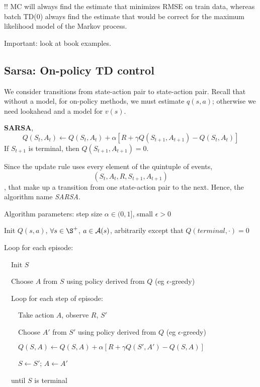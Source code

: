 \documentclass[sutton_barto_notes.tex]{subfiles}
\begin{document}
!! MC will always find the estimate that minimizes RMSE on train data, whereas batch TD(0) always find the estimate that would be correct for the maximum likelihood model of the Markov process.

Important: look at book examples.

\subsection{Sarsa: On-policy TD control}

We consider transitions from state-action pair to state-action pair. Recall that without a model, for on-policy methods, we must estimate $q(s,a)$; otherwise we need lookahead and a model for $v(s)$.

\begin{definition}
\textbf{SARSA},
$$ Q(S_t, A_t) \leftarrow Q(S_t, A_t) + \alpha [ R + \gamma Q( S_{t+1}, A_{t+1}) - Q(S_t, A_t)]$$
If $S_{t+1}$ is terminal, then $Q(S_{t+1}, A_{t+1}) = 0$.
\end{definition}

Since the update rule uses every element of the quintuple of events, $$(S_t, A_t, R, S_{t+1}, A_{t+1})$$, that make up a transition from one state-action pair to the next. Hence, the algorithm name \textit{SARSA}.

\begin{tcolorbox}[width=1.1\textwidth,title={SARSA (on-policy TD control} for estimating $Q\approx q_*$]
Algorithm parameters: step size $\alpha \in (0,1]$, small $\epsilon > 0$

Init $Q(s,a)$, $\forall s \in \S^+$, $a \in \operatorname*{\mathcal{A}}(s)$, arbitrarily except that $Q(terminal,\cdot)=0$

Loop for each episode:

$\quad$Init $S$

$\quad$Choose $A$ from $S$ using policy derived from $Q$ (eg $\epsilon$-greedy)

$\quad$Loop for each step of episode:

$\quad\quad$Take action $A$, observe $R$, $S'$

$\quad\quad$Choose $A'$ from $S'$ using policy derived from $Q$ (eg $\epsilon$-greedy)

$\quad\quad Q(S, A) \leftarrow Q(S, A) + \alpha [ R + \gamma Q( S', A') - Q(S, A)]$

$\quad\quad S \leftarrow S'$; $A \leftarrow A'$

$\quad$until $S$ is terminal
\end{tcolorbox}
\end{document}

